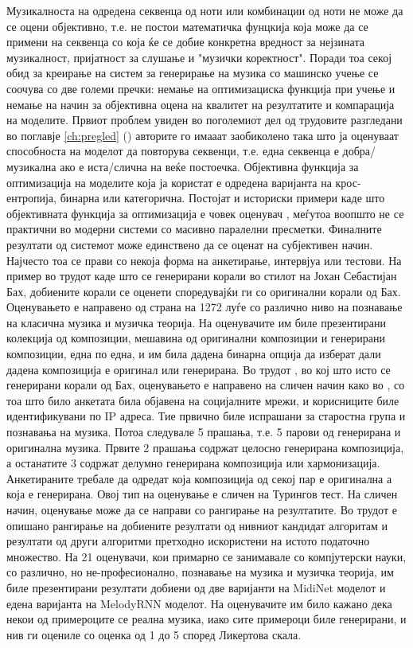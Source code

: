Музикалноста на одредена секвенца од ноти или комбинации од ноти не може да се оцени објективно, т.е. не постои математичка фунцкија која може да се примени на секвенца со која ќе се добие конкретна вредност за нејзината музикалност, пријатност за слушање и "музички коректност". Поради тоа секој обид за креирање на систем за генерирање на музика со машинско учење се соочува со две големи пречки: немање на оптимизациска функција при учење и немање на начин за објективна оцена на квалитет на резултатите и компарација на моделите. 
Првиот проблем увиден во поголемиот дел од трудовите разгледани во поглавје \ref{ch:pregled} (\cite{Tikhonov2017,Boulanger-Lewandowski2012,Boulanger-Lewandowski2014,Liang2017,Johnson2017,Yang2017,Eck2002,Goel2014}) авторите го имааат заобиколено така што ја оценуваат способноста на моделот да повторува секвенци, т.е. една секвенца е добра/музикална ако е иста/слична на веќе постоечка. Објективна функција за оптимизација на моделите која ја користат е одредена варијанта на крос-ентропија, бинарна или категорична. Постојат и историски примери каде што објективната функција за оптимизација е човек оценувач \cite{Biles1994}, меѓутоа воопшто не се практични во модерни системи со масивно паралелни пресметки.
Финалните резултати од системот може единствено да се оценат на субјективен начин. Најчесто тоа се прави со некоја форма на анкетирање, интервјуа или тестови. На пример во трудот \cite{Hadjeres2016} каде што се генерирани корали во стилот на Јохан Себастијан Бах, добиените корали се оценети споредувајќи ги со оригинални корали од Бах. Оценувањето е направено од страна на 1272 луѓе со различно ниво на познавање на класична музика и музичка теорија. На оценувачите им биле презентирани колекција од композиции, мешавина од оригинални композиции и генерирани композиции, една по една, и им била дадена бинарна опција да изберат дали дадена композиција е оригинал или генерирана.
Во трудот \cite{Liang2017}, во кој што исто се генерирани корали од Бах, оценувањето е направено на сличен начин како во \cite{Hadjeres2016}, со тоа што било анкетата била објавена на социјалните мрежи, и корисниците биле идентификувани по IP адреса. Тие првично биле испрашани за старостна група и познавања на музика. Потоа следувале 5 прашања, т.е. 5 парови од генерирана и оригинална музика. Првите 2 прашања содржат целосно генерирана композиција, а останатите 3 содржат делумно генерирана композиција или хармонизација. Анкетираните требале да одредат која композиција од секој пар е оригинална а која е генерирана.
Овој тип на оценување е сличен на Турингов тест. На сличен начин, оценување може да се направи со рангирање на резултатите. Во трудот \cite{Yang2017} е опишано рангирање на добиените резултати од нивниот кандидат алгоритам и резултати од други алгоритми претходно искористени на истото податочно множество. На 21 оценувачи, кои примарно се занимавале со компјутерски науки, со различно, но не-професионално, познавање на музика и музичка теорија, им биле презентирани резултати добиени од две варијанти на MidiNet моделот и едена варијанта на MelodyRNN моделот. На оценувачите им било кажано дека некои од примероците се реална музика, иако сите примероци биле генерирани, и нив ги оцениле со оценка од 1 до 5 според Ликертова скала.
